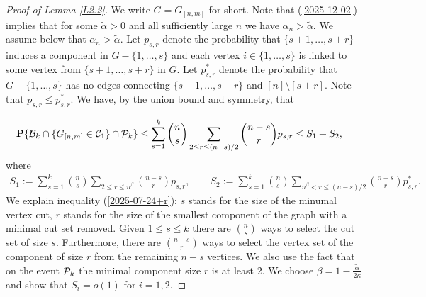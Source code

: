 \documentclass[11pt, a4paper]{article}
\newcommand{\PP}{{\bf{P}}}
\begin{document}
\begin{proof}[Proof of Lemma \ref{L2.2}]
We write $G=G_{[n,m]}$ for short.
Note that
 (\ref{2025-12-02}) implies  that 
 for some 
 ${\tilde \alpha}>0$  and all  sufficiently large $n$
 we have $\alpha_n>{\tilde \alpha}$. We assume below that 
 $\alpha_n>{\tilde \alpha}$.
Let $p_{s,r}$ denote the probability that 
$\{s+1,\dots, s+r\}$ 
induces  a component in $G-\{1,\dots, s\}$
and each vertex $i\in\{1,\dots, s\}$  is linked to some vertex from 
$\{s+1,\dots, s+r\}$
in $G$. 
Let $p^*_{s,r}$ denote the probability that 
$G-\{1,\dots, s\}$ has no edges connecting 
$\{s+1,\dots, s+r\}$  and $[n]\setminus [s+r]$. Note  that 
$p_{s,r}\le p^*_{s,r}$. 
We have, by the union bound and symmetry, that


\begin{align}
\label{2025-07-24+r}
&
\PP\{{\cal B}_{k}\cap \{G_{[n,m]}\in{\cal C}_1\}\cap {\cal P}_k\}
\le 
\sum_{s=1}^{k}\binom{n}{s}
\sum_{2\le r\le (n-s)/2}
\binom{n-s}{r}p_{s,r}
\le S_1+S_2,
\end{align}
where 
\begin{align*}
S_1
:=
\sum_{s=1}^{k}\binom{n}{s}
\sum_{2\le r\le n^{\beta}}
\binom{n-s}{r}p_{s,r},
\qquad
S_2:=
\sum_{s=1}^{k}\binom{n}{s}
\sum_{n^{\beta} < r\le (n-s)/2}
\binom{n-s}{r}p^*_{s,r}.
\end{align*}
We explain inequality  (\ref{2025-07-24+r}): $s$ stands for the size of the 
minumal vertex cut,  $r$ stands for the size of the  smallest  component  of the graph
with a  minimal cut set removed.  Given $1\le s\le k$ there are
$\binom{n}{s}$ ways to select the cut set of size $s$. Furthermore, there are $\binom{n-s}{r}$ ways to select the vertex set of the component of size $r$ from the remaining $n-s$ vertices.
 We also use the fact that on the event ${\cal P}_k$  the minimal component size $r$ is at least $2$.
We choose 
$\beta=1-\frac{{\tilde \alpha}}{2\kappa}$ and
show that $S_i=o(1)$ for $i=1,2$.

\smallskip



\end{proof}
\end{document}

